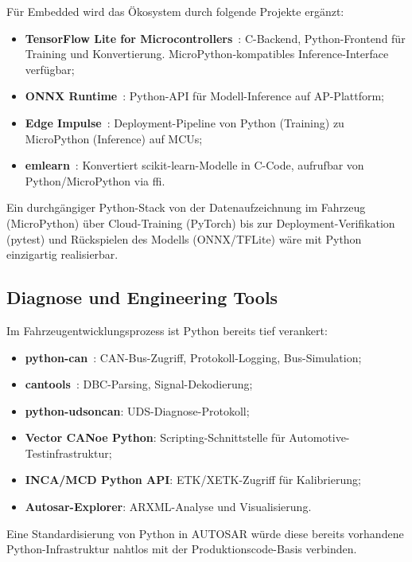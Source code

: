 ﻿\documentclass[12pt,a4paper,twoside]{article}
\begin{document}
Für Embedded wird das Ökosystem durch folgende Projekte ergänzt:
\begin{itemize}
  \item \textbf{TensorFlow Lite for Microcontrollers}~\cite{tflite_micro2021}:
        C-Backend, Python-Frontend für Training und Konvertierung.
        MicroPython-kompatibles Inference-Interface verfügbar;
  \item \textbf{ONNX Runtime}~\cite{onnxruntime2019}: Python-API für
        Modell-Inference auf AP-Plattform;
  \item \textbf{Edge Impulse}~\cite{edgeimpulse2023}: Deployment-Pipeline
        von Python (Training) zu MicroPython (Inference) auf MCUs;
  \item \textbf{emlearn}~\cite{emlearn2023}: Konvertiert scikit-learn-Modelle
        in C-Code, aufrufbar von Python/MicroPython via \gls{ffi}.
\end{itemize}

Ein durchgängiger Python-Stack von der Datenaufzeichnung im Fahrzeug
(MicroPython) über Cloud-Training (PyTorch) bis zur Deployment-Verifikation
(pytest) und Rückspielen des Modells (ONNX/TFLite) wäre
mit Python einzigartig realisierbar.

\subsection{Diagnose und Engineering Tools}
\label{subsec:diagnose}

Im Fahrzeugentwicklungsprozess ist Python bereits tief verankert:
\begin{itemize}
  \item \textbf{python-can}~\cite{python_can2023}: CAN-Bus-Zugriff,
        Protokoll-Logging, Bus-Simulation;
  \item \textbf{cantools}~\cite{cantools2022}: DBC-Parsing, Signal-Dekodierung;
  \item \textbf{python-udsoncan}: UDS-Diagnose-Protokoll;
  \item \textbf{Vector CANoe Python}: Scripting-Schnittstelle für
        Automotive-Testinfrastruktur;
  \item \textbf{INCA/MCD Python API}: ETK/XETK-Zugriff für Kalibrierung;
  \item \textbf{Autosar-Explorer}: ARXML-Analyse und Visualisierung.
\end{itemize}

Eine Standardisierung von Python in AUTOSAR würde diese bereits
vorhandene Python-Infrastruktur nahtlos mit der Produktionscode-Basis verbinden.
\end{document}
